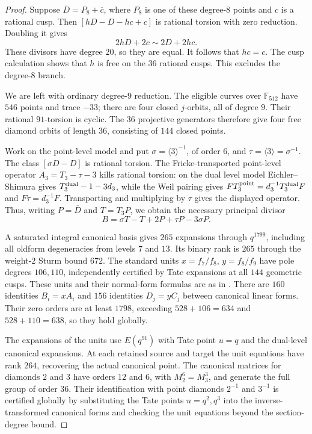 \begin{proof}
Suppose $\overline D=P_8+\overline c$, where $P_8$ is one of these degree-$8$ points and $c$ is a rational cusp. Then $[hD-D-hc+c]$ is rational torsion with zero reduction. Doubling it gives
\[
 2hD+2c\sim2D+2hc.
\]
These divisors have degree $20$, so they are equal. It follows that $hc=c$. The cusp calculation shows that $h$ is free on the $36$ rational cusps. This excludes the degree-$8$ branch.

We are left with ordinary degree-$9$ reduction. The eligible curves over $\mathbb F_{512}$ have $546$ points and trace $-33$; there are four closed $j$-orbits, all of degree $9$. Their rational $91$-torsion is cyclic. The $36$ projective generators therefore give four free diamond orbits of length $36$, consisting of $144$ closed points.

Work on the point-level model and put $\sigma=\langle3\rangle^{-1}$, of order $6$, and $\tau=\langle3\rangle=\sigma^{-1}$. The class $[\sigma D-D]$ is rational torsion. The Fricke-transported point-level operator $A_3=T_3-\tau-3$ kills rational torsion: on the dual level model Eichler--Shimura gives $T_3^{\rm dual}-1-3d_3$, while the Weil pairing gives $F T_3^{\rm point}=d_3^{-1}T_3^{\rm dual}F$ and $F\tau=d_3^{-1}F$. Transporting and multiplying by $\tau$ gives the displayed operator. Thus, writing $P=\overline D$ and $T=T_3P$, we obtain the necessary principal divisor
\[
 B=\sigma T-T+2P+\tau P-3\sigma P.
\]

A saturated integral canonical basis gives $265$ expansions through $q^{1799}$, including all oldform degeneracies from levels $7$ and $13$. Its binary rank is $265$ through the weight-$2$ Sturm bound $672$. The standard units $x=f_7/f_8$, $y=f_8/f_9$ have pole degrees $106,110$, independently certified by Tate expansions at all $144$ geometric cusps. These units and their normal-form formulas are as in \cite[Sections~2 and~2.1]{DvH}. There are $160$ identities $B_i=xA_i$ and $156$ identities $D_j=yC_j$ between canonical linear forms. Their zero orders are at least $1798$, exceeding $528+106=634$ and $528+110=638$, so they hold globally.

The expansions of the units use $E(q^{91})$ with Tate point $u=q$ and the dual-level canonical expansions. At each retained source and target the unit equations have rank $264$, recovering the actual canonical point. The canonical matrices for diamonds $2$ and $3$ have orders $12$ and $6$, with $M_2^6=M_3^3$, and generate the full group of order $36$. Their identification with point diamonds $2^{-1}$ and $3^{-1}$ is certified globally by substituting the Tate points $u=q^2,q^3$ into the inverse-transformed canonical forms and checking the unit equations beyond the section-degree bound.


\end{proof}
